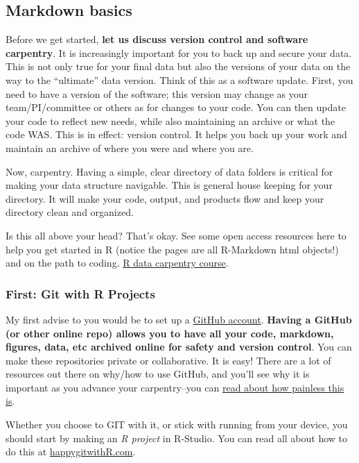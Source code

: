 \documentclass[
]{article}
\begin{document}
\hypertarget{markdown-basics}{%
\subsection{Markdown basics}\label{markdown-basics}}

Before we get started, \textbf{let us discuss version control and
software carpentry}. It is increasingly important for you to back up and
secure your data. This is not only true for your final data but also the
versions of your data on the way to the ``ultimate'' data version. Think
of this as a software update. First, you need to have a version of the
software; this version may change as your team/PI/committee or others as
for changes to your code. You can then update your code to reflect new
needs, while also maintaining an archive or what the code WAS. This is
in effect: version control. It helps you back up your work and maintain
an archive of where you were and where you are.

Now, carpentry. Having a simple, clear directory of data folders is
critical for making your data structure navigable. This is general house
keeping for your directory. It will make your code, output, and products
flow and keep your directory clean and organized.

Is this all above your head? That's okay. See some open access resources
here to help you get started in R (notice the pages are all R-Markdown
html objects!) and on the path to coding.
\href{https://datacarpentry.org/R-ecology-lesson/index.html}{R data
carpentry course}.

\hypertarget{first-git-with-r-projects}{%
\subsubsection{First: Git with R
Projects}\label{first-git-with-r-projects}}

My first advise to you would be to set up a
\href{https://github.com/}{GitHub account}. \textbf{Having a GitHub (or
other online repo) allows you to have all your code, markdown, figures,
data, etc archived online for safety and version control}. You can make
these repositories private or collaborative. It is easy! There are a lot
of resources out there on why/how to use GitHub, and you'll see why it
is important as you advance your carpentry--you can
\href{http://happygitwithr.com/big-picture.html}{read about how painless
this is}.

Whether you choose to GIT with it, or stick with running from your
device, you should start by making an \emph{R project} in R-Studio. You
can read all about how to do this at
\href{http://happygitwithr.com/rstudio-git-github.html}{happygitwithR.com}.
\end{document}
